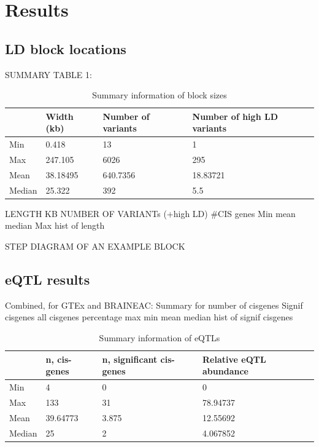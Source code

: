 \documentclass{article}
\begin{document}
\section{Results}
\subsection{LD block locations}


SUMMARY TABLE 1:
\begin{table}[h]
\begin{tabular}{|l|l|l|l|}
\hline
       & Width (kb) & Number of variants & Number of high LD variants \\ \hline
Min    & 0.418      & 13                 & 1                          \\ \hline
Max    & 247.105    & 6026               & 295                        \\ \hline
Mean   & 38.18495   & 640.7356           & 18.83721                   \\ \hline
Median & 25.322     & 392                & 5.5                        \\ \hline
\end{tabular}
\caption{Summary information of block sizes}
\end{table}
LENGTH KB  NUMBER OF VARIANTs (+high LD)  #CIS genes
Min
mean
median
Max
hist of length



STEP DIAGRAM OF AN EXAMPLE BLOCK


\subsection{eQTL results}
Combined, for GTEx and BRAINEAC:
Summary for number of cisgenes
Signif cisgenes all cisgenes percentage
max
min
mean
median
hist of signif cisgenes

\begin{table}[h]
\begin{tabular}{|l|l|l|l|}
\hline
       & n, cis-genes & n, significant cis-genes & Relative eQTL abundance \\ \hline
Min    & 4                   & 0                               & 0                                       \\ \hline
Max    & 133                 & 31                              & 78.94737                                \\ \hline
Mean   & 39.64773            & 3.875                           & 12.55692                                \\ \hline
Median & 25                  & 2                               & 4.067852                                \\ \hline
\end{tabular}
\caption{Summary information of eQTLs}
\end{table}
\end{document}
